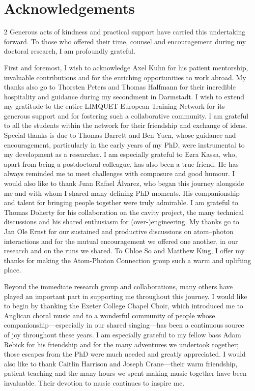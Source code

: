 \documentclass[../Thesis-IJspeert.tex]{subfiles}
\begin{document}
{
\cleardoublepage
\chapter*{Acknowledgements}
\thispagestyle{empty}
\begin{spacing}{2}
\begingroup
Generous acts of kindness and practical support have carried this undertaking forward. To those who offered their time, counsel and encouragement during my doctoral research, I am profoundly grateful.

First and foremost, I wish to acknowledge Axel Kuhn for his patient mentorship, invaluable contributions and for the enriching opportunities to work abroad. My thanks also go to Thorsten Peters and Thomas Halfmann for their incredible hospitality and guidance during my secondment in Darmstadt. I wish to extend my gratitude to the entire LIMQUET European Training Network for its generous support and for fostering such a collaborative community. I am grateful to all the students within the network for their friendship and exchange of ideas. Special thanks is due to Thomas Barrett and Ben Yuen, whose guidance and encouragement, particularly in the early years of my PhD, were instrumental to my development as a researcher. I am especially grateful to Ezra Kassa, who, apart from being a postdoctoral colleague, has also been a true friend. He has always reminded me to meet challenges with composure and good humour. I would also like to thank Juan Rafael Álvarez, who began this journey alongside me and with whom I shared many defining PhD moments. His companionship and talent for bringing people together were truly admirable. I am grateful to Thomas Doherty for his collaboration on the cavity project, the many technical discussions and his shared enthusiasm for (over-)engineering. My thanks go to Jan Ole Ernst for our sustained and productive discussions on atom–photon interactions and for the mutual encouragement we offered one another, in our research and on the runs we shared. To Chloe So and Matthew King, I offer my thanks for making the Atom-Photon Connection group such a warm and uplifting place.

Beyond the immediate research group and collaborations, many others have played an important part in supporting me throughout this journey. I would like to begin by thanking the Exeter College Chapel Choir, which introduced me to Anglican choral music and to a wonderful community of people whose companionship---especially in our shared singing---has been a continuous source of joy throughout these years. I am especially grateful to my fellow bass Adam Rebick for his friendship and for the many adventures we undertook together; those escapes from the PhD were much needed and greatly appreciated. I would also like to thank Caitlin Harrison and Joseph Crane---their warm friendship, patient teaching and the many hours we spent making music together have been invaluable. Their devotion to music continues to inspire me.


\end{spacing}}
\end{document}

